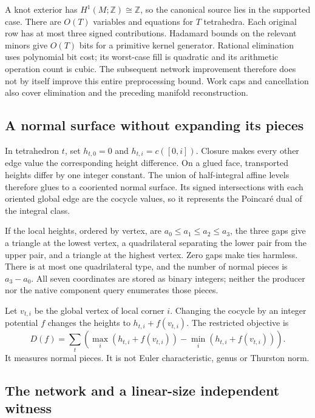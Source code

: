 A knot exterior has $H^1(M;\mathbb Z)\cong\mathbb Z$, so the canonical
source lies in the supported case. There are $O(T)$ variables and equations
for $T$ tetrahedra. Each original row has at most three signed contributions.
Hadamard bounds on the relevant minors give $O(T)$ bits for a primitive
kernel generator. Rational elimination uses polynomial bit cost; its
worst-case fill is quadratic and its arithmetic operation count is cubic.
The subsequent network improvement therefore does not by itself improve
this entire preprocessing bound. Work caps and cancellation also cover
elimination and the preceding manifold reconstruction.

\subsection{A normal surface without expanding its pieces}

In tetrahedron $t$, set $h_{t,0}=0$ and
$h_{t,i}=c([0,i])$. Closure makes every other edge value the corresponding
height difference. On a glued face, transported heights differ by one
integer constant. The union of half-integral affine levels therefore glues
to a cooriented normal surface. Its signed intersections with each oriented
global edge are the cocycle values, so it represents the Poincar\'e dual
of the integral class.

If the local heights, ordered by vertex, are
$a_0\le a_1\le a_2\le a_3$, the three gaps give a triangle at the lowest
vertex, a quadrilateral separating the lower pair from the upper pair,
and a triangle at the highest vertex. Zero gaps make ties harmless.
There is at most one quadrilateral type, and the number of normal pieces
is $a_3-a_0$. All seven coordinates are stored as binary integers;
neither the producer nor the native component query enumerates those pieces.

Let $v_{t,i}$ be the global vertex of local corner $i$. Changing the
cocycle by an integer potential $f$ changes the heights to
$h_{t,i}+f(v_{t,i})$. The restricted objective is
\[
 D(f)=\sum_t\left(\max_i(h_{t,i}+f(v_{t,i}))
                    -\min_i(h_{t,i}+f(v_{t,i}))\right).
\]
It measures normal pieces. It is not Euler characteristic, genus or
Thurston norm.

\subsection{The network and a linear-size independent witness}

